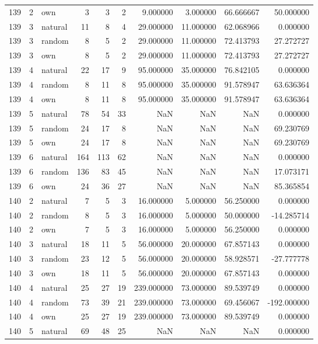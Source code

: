 \begin{table}[htbp]
\begin{tabular}{rrlrrrrrrr}
139 & 2 & own & 3 & 3 & 2 & 9.000000 & 3.000000 & 66.666667 & 50.000000 \\
139 & 3 & natural & 11 & 8 & 4 & 29.000000 & 11.000000 & 62.068966 & 0.000000 \\
139 & 3 & random & 8 & 5 & 2 & 29.000000 & 11.000000 & 72.413793 & 27.272727 \\
139 & 3 & own & 8 & 5 & 2 & 29.000000 & 11.000000 & 72.413793 & 27.272727 \\
139 & 4 & natural & 22 & 17 & 9 & 95.000000 & 35.000000 & 76.842105 & 0.000000 \\
139 & 4 & random & 8 & 11 & 8 & 95.000000 & 35.000000 & 91.578947 & 63.636364 \\
139 & 4 & own & 8 & 11 & 8 & 95.000000 & 35.000000 & 91.578947 & 63.636364 \\
139 & 5 & natural & 78 & 54 & 33 & NaN & NaN & NaN & 0.000000 \\
139 & 5 & random & 24 & 17 & 8 & NaN & NaN & NaN & 69.230769 \\
139 & 5 & own & 24 & 17 & 8 & NaN & NaN & NaN & 69.230769 \\
139 & 6 & natural & 164 & 113 & 62 & NaN & NaN & NaN & 0.000000 \\
139 & 6 & random & 136 & 83 & 45 & NaN & NaN & NaN & 17.073171 \\
139 & 6 & own & 24 & 36 & 27 & NaN & NaN & NaN & 85.365854 \\
140 & 2 & natural & 7 & 5 & 3 & 16.000000 & 5.000000 & 56.250000 & 0.000000 \\
140 & 2 & random & 8 & 5 & 3 & 16.000000 & 5.000000 & 50.000000 & -14.285714 \\
140 & 2 & own & 7 & 5 & 3 & 16.000000 & 5.000000 & 56.250000 & 0.000000 \\
140 & 3 & natural & 18 & 11 & 5 & 56.000000 & 20.000000 & 67.857143 & 0.000000 \\
140 & 3 & random & 23 & 12 & 5 & 56.000000 & 20.000000 & 58.928571 & -27.777778 \\
140 & 3 & own & 18 & 11 & 5 & 56.000000 & 20.000000 & 67.857143 & 0.000000 \\
140 & 4 & natural & 25 & 27 & 19 & 239.000000 & 73.000000 & 89.539749 & 0.000000 \\
140 & 4 & random & 73 & 39 & 21 & 239.000000 & 73.000000 & 69.456067 & -192.000000 \\
140 & 4 & own & 25 & 27 & 19 & 239.000000 & 73.000000 & 89.539749 & 0.000000 \\
140 & 5 & natural & 69 & 48 & 25 & NaN & NaN & NaN & 0.000000 \\

\end{tabular}
\end{table}
